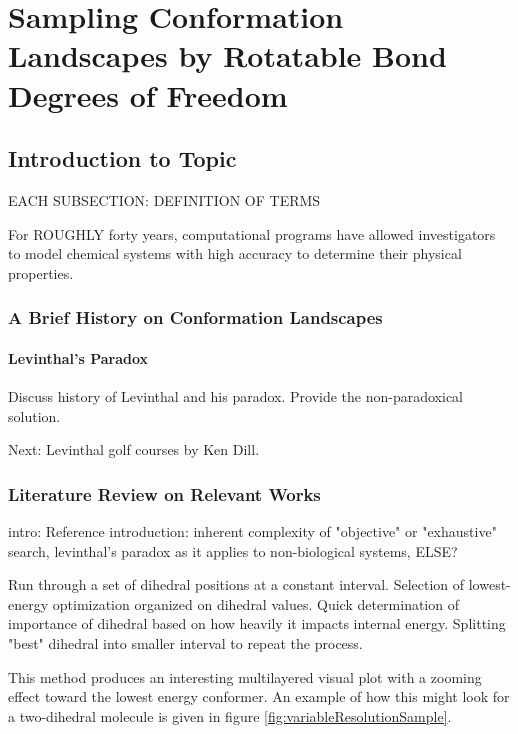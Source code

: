 \chapter{Sampling Conformation Landscapes by Rotatable Bond Degrees of Freedom}
\label{ch:ConformationLandscape}

\section{Introduction to Topic}

EACH SUBSECTION: DEFINITION OF TERMS

For ROUGHLY forty years, computational programs have allowed investigators to model chemical systems with high accuracy to determine their physical properties.

\subsection{A Brief History on Conformation Landscapes}

\subsubsection{Levinthal's Paradox}

Discuss history of Levinthal and his paradox. Provide the non-paradoxical solution. 

Next: Levinthal golf courses by Ken Dill.
\subsection{Literature Review on Relevant Works}











intro: 
Reference introduction: inherent complexity of "objective" or "exhaustive" search, levinthal's paradox as it applies to non-biological systems, ELSE?






Run through a set of dihedral positions at a constant interval. 
Selection of lowest-energy optimization organized on dihedral values. 
Quick determination of importance of dihedral based on how heavily it impacts internal energy. 
Splitting "best" dihedral into smaller interval to repeat the process. 

This method produces an interesting multilayered visual plot with a zooming effect toward the lowest energy conformer.
An example of how this might look for a two-dihedral molecule is given in figure \ref{fig:variableResolutionSample}.

